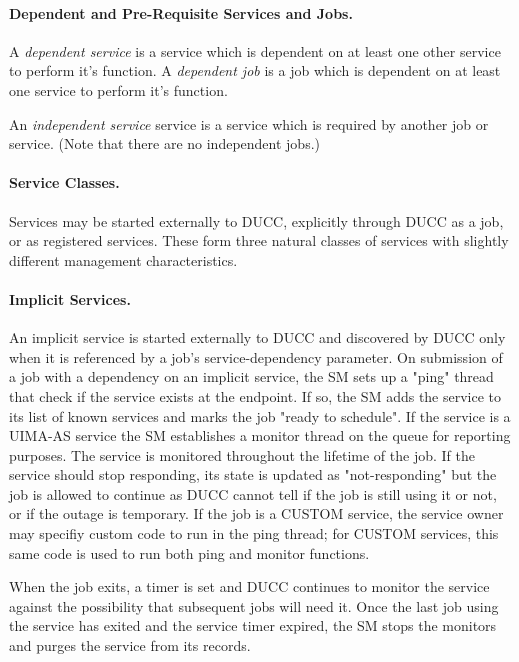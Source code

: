       \paragraph{Dependent and Pre-Requisite Services and Jobs.} A {\em dependent service} is a
      service which is dependent on at least one other service to perform it's function. A {\em
        dependent job} is a job which is dependent on at least one service to perform it's function.

      An {\em independent service} service is a service which is required by another job or
      service. (Note that there are no independent jobs.)

      \paragraph{Service Classes.} Services may be started externally to DUCC, explicitly through
      DUCC as a job, or as registered services. These form three natural classes of services with
      slightly different management characteristics.

      \paragraph{Implicit Services.} An implicit service is started externally to DUCC and discovered by DUCC only
      when it is referenced by a job's service-dependency parameter. On submission of a job with a
      dependency on an implicit service, the SM sets up a "ping" thread that check if the service
      exists at the endpoint. If so, the SM adds the service to its list of known services and marks
      the job "ready to schedule". If the service is a UIMA-AS service the SM establishes a monitor
      thread on the queue for reporting purposes. The service is monitored throughout the lifetime of
      the job. If the service should stop responding, its state is updated as "not-responding" but the
      job is allowed to continue as DUCC cannot tell if the job is still using it or not, or if the
      outage is temporary. If the job is a CUSTOM service, the service owner may specifiy custom code
      to run in the ping thread; for CUSTOM services, this same code is used to run both ping and
      monitor functions.
      
      When the job exits, a timer is set and DUCC continues to monitor the service against the
      possibility that subsequent jobs will need it. Once the last job using the service has exited
      and the service timer expired, the SM stops the monitors and purges the service from its
      records.
      
